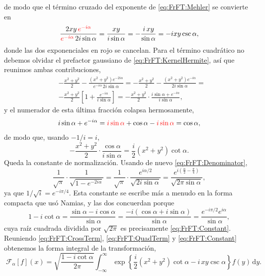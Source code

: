 			de modo que el término cruzado del exponente de \eqref{eq:FrFT:Mehler} se convierte en
			\begin{equation}\label{eq:FrFT:CrossTerm}
				\frac{2xy\,{\color{red}e^{-i\alpha}}}{{\color{red}e^{-i\alpha}}\,2i\sin\alpha} = \frac{xy}{i\sin\alpha} = -\frac{i\,xy}{\sin\alpha} = -ixy\csc\alpha,
			\end{equation}
			donde las dos exponenciales en rojo se cancelan. Para el término cuadrático no debemos olvidar el prefactor gaussiano de \eqref{eq:FrFT:KernelHermite}, así que reunimos ambas contribuciones,
			\begin{align*}
				& -\frac{x^{2}+y^{2}}{2} - \frac{\left(x^{2}+y^{2}\right)e^{-2i\alpha}}{e^{-i\alpha}\,2i\sin\alpha} = -\frac{x^{2}+y^{2}}{2} - \frac{\left(x^{2}+y^{2}\right)e^{-i\alpha}}{2i\sin\alpha} = \\
				& -\frac{x^{2}+y^{2}}{2}\left[1 + \frac{e^{-i\alpha}}{i\sin\alpha}\right] = -\frac{x^{2}+y^{2}}{2}\cdot\frac{i\sin\alpha + e^{-i\alpha}}{i\sin\alpha},
			\end{align*}
			y el numerador de esta última fracción colapsa hermosamente,
			\begin{equation}\label{eq:FrFT:Collapse}
				i\sin\alpha + e^{-i\alpha} = {\color{red}i\sin\alpha} + \cos\alpha - {\color{red}i\sin\alpha} = \cos\alpha,
			\end{equation}
			de modo que, usando $-1/i = i$,
			\begin{equation}\label{eq:FrFT:QuadTerm}
				-\frac{x^{2}+y^{2}}{2}\cdot\frac{\cos\alpha}{i\sin\alpha} = \frac{i}{2}\left(x^{2}+y^{2}\right)\cot\alpha.
			\end{equation}
			Queda la constante de normalización. Usando de nuevo \eqref{eq:FrFT:Denominator},
			\begin{equation}\label{eq:FrFT:Constant}
				\frac{1}{\sqrt{\pi}}\cdot\frac{1}{\sqrt{1-e^{-2i\alpha}}} = \frac{1}{\sqrt{\pi}}\cdot\frac{e^{i\alpha/2}}{\sqrt{2i\sin\alpha}} = \frac{e^{i\left(\frac{\alpha}{2}-\frac{\pi}{4}\right)}}{\sqrt{2\pi\sin\alpha}},
			\end{equation}
			ya que $1/\sqrt{i} = e^{-i\pi/4}$. Esta constante se escribe más a menudo en la forma compacta que usó Namias, y las dos concuerdan porque
			\begin{equation}\label{eq:FrFT:ConstantEquiv}
				1 - i\cot\alpha = \frac{\sin\alpha - i\cos\alpha}{\sin\alpha} = \frac{-i\left(\cos\alpha + i\sin\alpha\right)}{\sin\alpha} = \frac{e^{-i\pi/2}e^{i\alpha}}{\sin\alpha},
			\end{equation}
			cuya raíz cuadrada dividida por $\sqrt{2\pi}$ es precisamente \eqref{eq:FrFT:Constant}. Reuniendo \eqref{eq:FrFT:CrossTerm}, \eqref{eq:FrFT:QuadTerm} y \eqref{eq:FrFT:Constant} obtenemos la forma integral de la transformación,
			\begin{equation}\label{eq:FrFT:Kernel}
				\boxed{\;\mathcal{F}_{\alpha}[f](x) = \sqrt{\frac{1-i\cot\alpha}{2\pi}}\int_{-\infty}^{\infty}\exp\left\{\frac{i}{2}\left(x^{2}+y^{2}\right)\cot\alpha - i\,xy\csc\alpha\right\}f(y)\,\mathrm{d}y.\;}
			\end{equation}

